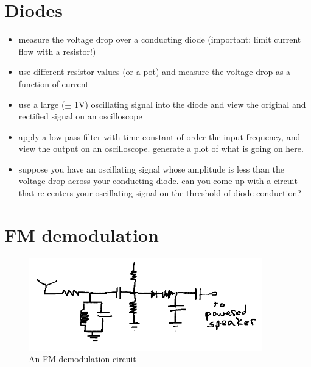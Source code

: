 \documentclass[11pt]{article}
\begin{document}
\section{Diodes}

\begin{itemize}
\item measure the voltage drop over a conducting diode (important: limit current flow with a resistor!)
\item use different resistor values (or a pot) and measure the voltage drop as a function of current
\item use a large ($\pm$ 1V) oscillating signal into the diode and view the original and rectified 
signal on an oscilloscope
\item apply a low-pass filter with time constant of order the input frequency, and view the 
output on an oscilloscope.  generate a plot of what is going on here.
\item suppose you have an oscillating signal whose amplitude is less than the voltage drop across your conducting
diode.  can you come up with a circuit that re-centers your oscillating signal on the threshold 
of diode conduction?
\end{itemize}

\section{FM demodulation}
\begin{figure}[h]
\centering
\includegraphics[width=4in]{analog_lab_1_plots/fm_demodulation.png}
\caption{An FM demodulation circuit}\label{fig:fm_demodulation}
\end{figure}
\end{document}
